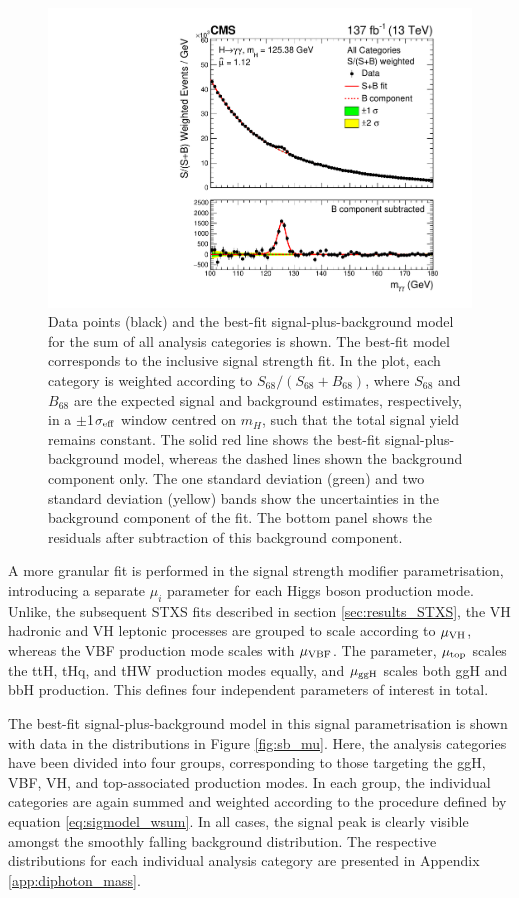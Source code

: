 \begin{figure}[htb]
  \centering
  \includegraphics[width=.6\textwidth]{Figures/hgg_results/sPlusBweighted.pdf}
  \caption[Observed diphoton mass distribution for the sum of all analysis categories]
  {
    Data points (black) and the best-fit signal-plus-background model for the sum of all analysis categories is shown. The best-fit model corresponds to the inclusive signal strength fit. In the plot, each category is weighted according to $S_{68}/(S_{68}+B_{68})$, where $S_{68}$ and $B_{68}$ are the expected signal and background estimates, respectively, in a $\pm$1$\sigma_{\rm{eff}}$ window centred on $m_H$, such that the total signal yield remains constant. The solid red line shows the best-fit signal-plus-background model, whereas the dashed lines shown the background component only. The one standard deviation (green) and two standard deviation (yellow) bands show the uncertainties in the background component of the fit. The bottom panel shows the residuals after subtraction of this background component.
  }
  \label{fig:sb_inclusive}
\end{figure}

A more granular fit is performed in the signal strength modifier parametrisation, introducing a separate $\mu_i$ parameter for each Higgs boson production mode. Unlike, the subsequent STXS fits described in section \ref{sec:results_STXS}, the VH hadronic and VH leptonic processes are grouped to scale according to $\mu_{\rm{VH}}$, whereas the VBF production mode scales with $\mu_{\rm{VBF}}$. The parameter, $\mu_{\rm{top}}$ scales the ttH, tHq, and tHW production modes equally, and $\mu_{\rm{ggH}}$ scales both ggH and bbH production. This defines four independent parameters of interest in total.

The best-fit signal-plus-background model in this signal parametrisation is shown with data in the \mgg distributions in Figure \ref{fig:sb_mu}. Here, the analysis categories have been divided into four groups, corresponding to those targeting the ggH, VBF, VH, and top-associated production modes. In each group, the individual categories are again summed and weighted according to the procedure defined by equation \ref{eq:sigmodel_wsum}. In all cases, the signal peak is clearly visible amongst the smoothly falling background distribution. The respective distributions for each individual analysis category are presented in Appendix \ref{app:diphoton_mass}.

